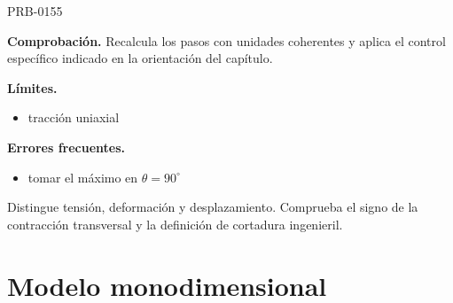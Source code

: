 \begin{studiumworked}{PRB-0155}
\par\textbf{Comprobación.} Recalcula los pasos con unidades coherentes y aplica el control específico indicado en la orientación del capítulo.

\par\noindent\begin{minipage}{\linewidth}

\textbf{Límites.}\begin{itemize}\item tracción uniaxial\end{itemize}

\textbf{Errores frecuentes.}\begin{itemize}\item tomar el máximo en $\theta = 90^{\circ}$\end{itemize}

\begin{tcolorbox}[studiumcheck,breakable=false,title={Síntesis y comprobación}]Distingue tensión, deformación y desplazamiento. Comprueba el signo de la contracción transversal y la definición de cortadura ingenieril.\end{tcolorbox}

\end{minipage}

\end{studiumworked}

\chapter{Modelo monodimensional}


\Needspace{.3\textheight}

